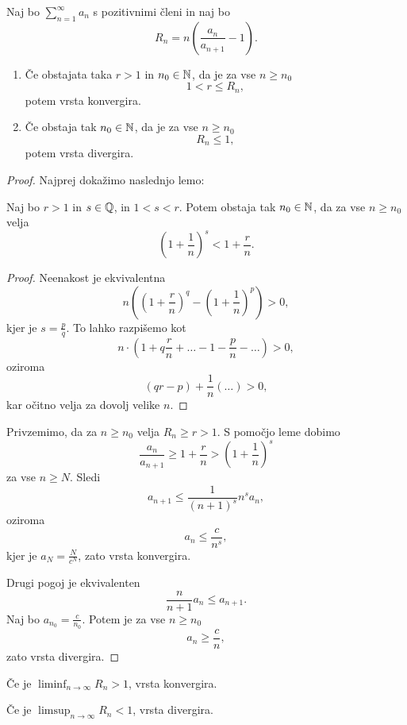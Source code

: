 \documentclass[12pt, a4paper]{article}
\begin{document}
\begin{izrek}
Naj bo $\displaystyle\sum_{n=1}^\infty a_n$ s pozitivnimi členi in naj bo
\[
R_n=n\left(\frac{a_n}{a_{n+1}}-1\right).
\]

\begin{enumerate}[label=\arabic*)]
\item Če obstajata taka $r>1$ in $n_0\in\mathbb{N}$, da je za vse $n\geq n_0$
\[
1<r\leq R_n,
\]
potem vrsta konvergira.
\item Če obstaja tak $n_0\in\mathbb{N}$, da je za vse $n\geq n_0$
\[
R_n\leq 1,
\]
potem vrsta divergira.
\end{enumerate}
\end{izrek}

\begin{proof}
Najprej dokažimo naslednjo lemo:

\begin{lema*}
Naj bo $r>1$ in $s\in\mathbb{Q}$, in $1<s<r$. Potem obstaja tak $n_0\in\mathbb{N}$, da za vse $n\geq n_0$ velja
\[
\left(1+\frac{1}{n}\right)^s<1+\frac{r}{n}.
\]
\end{lema*}

\begin{proof}
Neenakost je ekvivalentna
\[
n\left(\left(1+\frac{r}{n}\right)^q-\left(1+\frac{1}{n}\right)^p\right)>0,
\]
kjer je $s=\frac{p}{q}$. To lahko razpišemo kot
\[
n\cdot\left(1+q\frac{r}{n}+\dots-1-\frac{p}{n}-\dots\right)>0,
\]
oziroma
\[
(qr-p)+\frac{1}{n}(\dots)>0,
\]
kar očitno velja za dovolj velike $n$.
\end{proof}

Privzemimo, da za $n\geq n_0$ velja $R_n\geq r>1$. S pomočjo leme dobimo
\[
\frac{a_n}{a_{n+1}}\geq 1+\frac{r}{n}>\left(1+\frac{1}{n}\right)^s
\]
za vse $n\geq N$. Sledi
\[
a_{n+1}\leq \frac{1}{(n+1)^s}n^s a_n,
\]
oziroma
\[
a_n\leq \frac{c}{n^s},
\]
kjer je $a_N=\frac{N}{c^N}$, zato vrsta konvergira.

Drugi pogoj je ekvivalenten
\[
\frac{n}{n+1}a_n\leq a_{n+1}.
\]
Naj bo $a_{n_0}=\frac{c}{n_0}$. Potem je za vse $n\geq n_0$
\[
a_n\geq\frac{c}{n},
\]
zato vrsta divergira.
\end{proof}

\begin{posledica}
Če je $\displaystyle\liminf_{n\to\infty}R_n>1$, vrsta konvergira.
\end{posledica}

\begin{posledica}
Če je $\displaystyle\limsup_{n\to\infty}R_n<1$, vrsta divergira.
\end{posledica}
\end{document}
